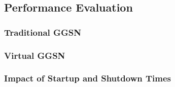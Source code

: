\subsection{Performance Evaluation}\label{sec:cloud:virtualized_network_functions:performance_evaluation}
\subsubsection*{Traditional GGSN}\label{sec:cloud:virtualized_network_functions:performance_evaluation:traditional_ggsn}
\subsubsection*{Virtual GGSN}\label{sec:cloud:virtualized_network_functions:virtual_ggsn}
\subsubsection*{Impact of Startup and Shutdown Times}\label{sec:cloud_virtualized_network_functions:startup_shutdown}
